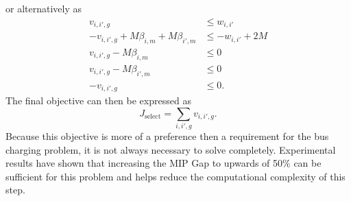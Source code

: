 or alternatively as
\begin{equation}\begin{aligned}
	v_{i,i',g} &\le w_{i,i'} \\
	-v_{i,i',g} + M\beta_{i,m} + M\beta_{i',m}&\le -w_{i,i'} + 2M \\
	v_{i,i',g} - M\beta_{i,m}  &\le 0 \\
	v_{i,i',g} - M\beta_{i',m} &\le 0\\
	-v_{i,i',g} &\le 0.
\end{aligned}\end{equation}
The final objective can then be expressed as
\begin{equation}
	J_{\text{select}} = \sum_{i,i',g} v_{i,i',g}.
\end{equation}
Because this objective is more of a preference then a requirement for the bus charging problem, it is not always necessary to solve completely.  Experimental results have shown that increasing the MIP Gap to upwards of 50\% can be sufficient for this problem and helps reduce the computational complexity of this step.
